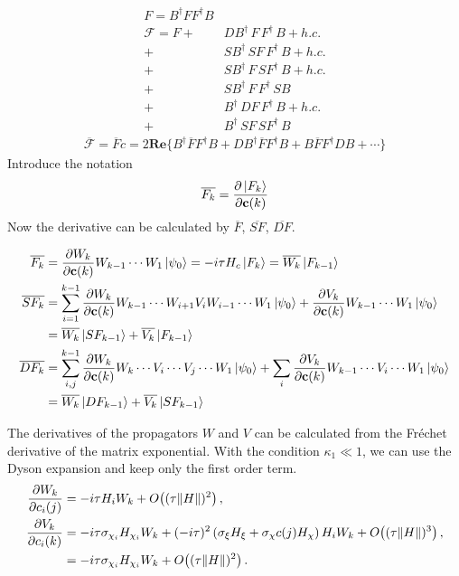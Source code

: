 \documentclass{notes2}
\newcommand{\dvbar}[1]{\overline{#1}}
\begin{document}
\begin{align*}
    F = B^\dagger FF^\dagger B\\
    \mathcal{F} = F + &DB^\dagger\, F\, F^\dagger\, B + h.c.\\
    + &SB^\dagger\, SF\, F^\dagger\, B + h.c.\\
    + &SB^\dagger\, F\, SF^\dagger\, B + h.c.\\
    + &SB^\dagger\, F\, F^\dagger\, SB \\
    + &B^\dagger\, DF\, F^\dagger\, B + h.c.\\
    + &B^\dagger\, SF\, SF^\dagger\, B
\end{align*}
\begin{align*}
    \mathcal{\overline{F}} = \dvbar{F}{c} = 2\mathbf{Re}\{B^\dagger \dvbar{F}F^\dagger B + DB^\dagger \dvbar{F}F^\dagger B + B\dvbar{F}F^\dagger DB + \cdots\}
\end{align*}
Introduce the notation
\begin{equation}
    \dvbar{F_k} = \pdv{\ket{F_k}}{\vb c(k)}
\end{equation}
Now the derivative can be calculated by $\dvbar{F}$, $\dvbar{SF}$, $\dvbar{DF}$.

\begin{align*}
    \dvbar{F_k} &= \pdv{W_k}{\vb c(k)} W_{k-1} \cdots W_1 \ket{\psi_0} = -i\tau H_c \ket{F_k} = \dvbar{W_k}\ket{F_{k-1}}\\
    \dvbar{SF_k} &= \sum_{i=1}^{k-1} \pdv{W_k}{\vb c(k)} W_{k-1} \cdots W_{i+1}V_i W_{i-1} \cdots W_1\ket{\psi_0} + \pdv{V_k}{\vb c(k)}W_{k-1} \cdots W_1\ket{\psi_0} \\
    &= \dvbar{W_k}\ket{SF_{k-1}} + \dvbar{V_k}\ket{F_{k-1}} \\
    \dvbar{DF_k} &= \sum_{i,j}^{k-1} \pdv{W_k}{\vb c(k)} W_k \cdots V_i \cdots V_j \cdots W_1\ket{\psi_0} + \sum_{i}\pdv{V_k}{\vb c(k)}W_{k-1}\cdots V_{i}\cdots W_1\ket{\psi_0} \\
    &= \dvbar{W_k}\ket{DF_{k-1}} + \dvbar{V_k}\ket{SF_{k-1}}
\end{align*}

The derivatives of the propagators $W$ and $V$ can be calculated from the Fr\'echet derivative of the matrix exponential. With the condition $\kappa_1\ll 1$, we can use the Dyson expansion and keep only the first order term.
\begin{align}
    \pdv{W_k}{c_i(j)}
    &=
    -i\tau H_i W_k
    + O\!\left((\tau\norm{H})^2\right),
    \\
    \pdv{V_k}{c_i(k)}
    &=
    -i\tau \sigma_{\chi_i} H_{\chi_i}W_k
    + (-i\tau)^2
    \left(
        \sigma_{\xi}H_{\xi}
        + \sigma_{\chi}c(j)H_{\chi}
    \right)
    H_i W_k + O\!\left((\tau\norm{H})^3\right) ,
    \notag\\
    &=
    -i\tau \sigma_{\chi_i}H_{\chi_i}W_k
    + O\!\left((\tau\norm{H})^2\right) .
\end{align}
\end{document}
